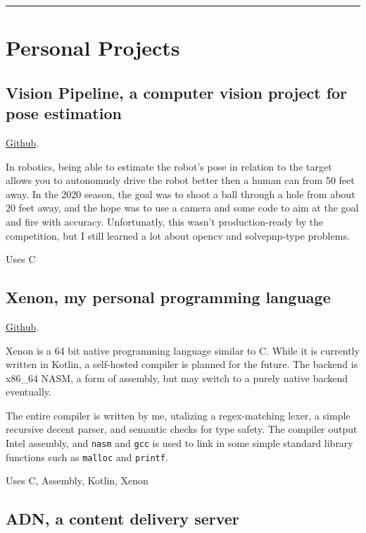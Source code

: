 \documentclass[10pt,letterpaper]{article}
\newcommand{\CPP}
{C\nolinebreak[4]\hspace{-.05em}\raisebox{.35ex}{\footnotesize\bf ++}}
\def\code#1{\texttt{#1}}
\begin{document}
    \vspace{0.5em}
    \hrule

    \section*{Personal Projects}

    \subsection*{Vision Pipeline, a computer vision project for pose estimation}
    \href{https://github.com/CougarProgramming623/vision-pipeline}{Github}. 
    
    In robotics, being able to estimate the robot's pose in relation to the target
    allows you to autonomusly drive the robot better then a human can from 50 feet away.
    In the 2020 season, the goal was to shoot a ball through a hole from about 20 feet away,
    and the hope was to use a camera and some code to aim at the goal and fire with accuracy.
    Unfortunatly, this wasn't production-ready by the competition,
    but I still learned a lot about opencv and solvepnp-type problems. 

    \vspace{0.5em}
    \noindent Uses \CPP

    \subsection*{Xenon, my personal programming language}
    \href{https://github.com/Mee42/Xenon}{Github}.
    
    Xenon is a 64 bit native programming language similar to C.
    While it is currently written in Kotlin, a self-hosted compiler is planned for the future.
    The backend is x86\_64 NASM, a form of assembly,
    but may switch to a purely native backend eventually.
    
    The entire compiler is written by me, utalizing a regex-matching lexer, 
    a simple recursive decent parser,
    and semantic checks for type safety.
    The compiler output Intel assembly,
    and \code{nasm} and \code{gcc} is used to link in some simple standard library functions such as
    \code{malloc} and \code{printf}.
    
    \vspace{0.5em}
    \noindent Uses C, Assembly, Kotlin, Xenon

    \subsection*{ADN, a content delivery server}
    
\end{document}
